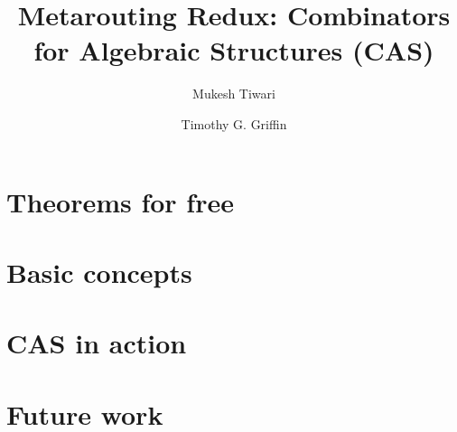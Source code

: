 \documentclass[sigconf,10pt]{acmart}
\theoremstyle{mytheoremstyle}
\begin{document}
\mathchardef{}

\title[Metarouting Redux]{Metarouting Redux: Combinators for Algebraic Structures (CAS)}

\author{Mukesh Tiwari}

\author{Timothy G. Griffin}

\begin{abstract}

\end{abstract}

\maketitle

\section{Theorems for free}
\label{sec:introduction}


\section{Basic concepts}
\label{sec:basics}


\section{CAS in action}
\label{sec:demo}


\section{Future work}
\label{sec:conclusions}




\end{document}
